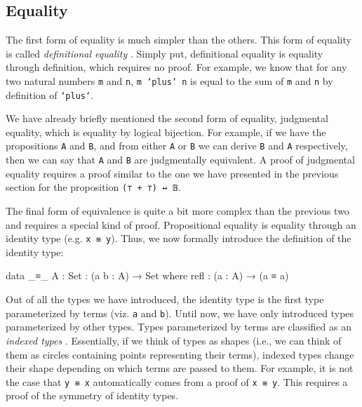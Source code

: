 \documentclass[12pt]{article}
\begin{document}
\subsection*{Equality}
The first form of equality is much simpler than the others. This form of
equality is called {\it definitional equality} \cite{}. Simply put, definitional
equality is equality through definition, which requires no proof. For example,
we know that for any two natural numbers {\tt m} and {\tt n}, {\tt m `plus` n}
is equal to the sum of {\tt m} and {\tt n} by definition of {\tt `plus`}.

We have already briefly mentioned the second form of equality, judgmental
equality, which is equality by logical bijection. For example, if we have the
propositions {\tt A} and {\tt B}, and from either {\tt A} or {\tt B} we can
derive {\tt B} and {\tt A} respectively, then we can say that {\tt A} and
{\tt B} are judgmentally equivalent. A proof of judgmental equality requires a
proof similar to the one we have presented in the previous section for the
proposition {\tt (⊤ + ⊤) ↔ 𝔹}.

The final form of equivalence is quite a bit more complex than the previous two
and requires a special kind of proof. Propositional equality is equality through
an identity type (e.g. {\tt x ≡ y}). Thus, we now formally introduce the
definition of the identity type:
\begin{center}
\begin{minipage}{0.9\textwidth}
\begin{code}
data _≡_ {A : Set} : (a b : A) → Set where
  refl : (a : A) → (a ≡ a)
\end{code}
\end{minipage}
\end{center}
Out of all the types we have introduced, the identity type is the first type
parameterized by terms (viz. {\tt a} and {\tt b}). Until now, we have only
introduced types parameterized by other types. Types parameterized by terms are
classified as an {\em indexed types} \cite{}. Essentially, if we think of types
as shapes (i.e., we can think of them as circles containing points representing
their terms), indexed types change their shape depending on which terms are
passed to them. For example, it is not the case that {\tt y ≡ x} automatically
comes from a proof of {\tt x ≡ y}. This requires a proof of the symmetry of
identity types.
\end{document}
